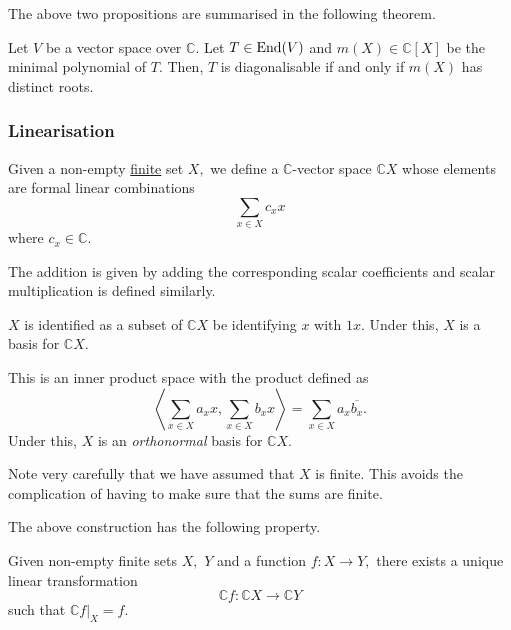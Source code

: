 The above two propositions are summarised in the following theorem.

\begin{thm} \label{thm:splitdistinctdiagonalise}
	Let $V$ be a vector space over $\mathbb{C}.$ Let $T \in \operatorname{End}(V)$ and $m(X) \in \mathbb{C}[X]$ be the minimal polynomial of $T.$ Then, $T$ is diagonalisable if and only if $m(X)$ has distinct roots.	
\end{thm}

\subsubsection{Linearisation} \label{subsec:linearisation}
\begin{defn}[Linearisation] \label{defn:linearisation}
	Given a non-empty \underline{finite} set $X,$ we define a $\mathbb{C}$-vector space $\mathbb{C}X$ whose elements are formal linear combinations
	\begin{equation*} 
		\sum_{x \in X} c_x x
	\end{equation*}
	where $c_x \in \mathbb{C}.$

	The addition is given by adding the corresponding scalar coefficients and scalar multiplication is defined similarly.

	$X$ is identified as a subset of $\mathbb{C}X$ be identifying $x$ with $1x.$ Under this, $X$ is a basis for $\mathbb{C}X.$

	This is an inner product space with the product defined as
	\begin{equation*} 
		\left\langle \sum_{x \in X} a_xx, \sum_{x \in X} b_xx\right\rangle = \sum_{x \in X} a_x \overline{b_x}.
	\end{equation*}
	Under this, $X$ is an \emph{orthonormal} basis for $\mathbb{C}X.$
\end{defn}

Note very carefully that we have assumed that $X$ is finite. This avoids the complication of having to make sure that the sums are finite.

The above construction has the following property.
\begin{prop} \label{prop:linearfuncextend}
	Given non-empty finite sets $X,$ $Y$ and a function $f : X \to Y,$ there exists a unique linear transformation 
	\begin{equation*} 
		\mathbb{C}f : \mathbb{C}X \to \mathbb{C}Y
	\end{equation*}
	such that $\mathbb{C}f|_X = f.$
\end{prop}


